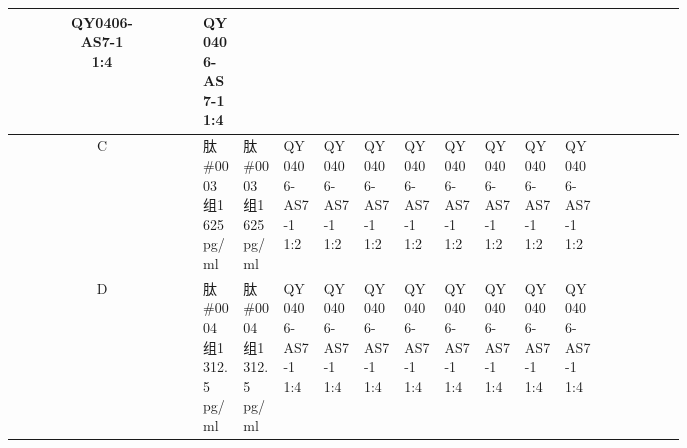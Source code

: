 \documentclass[UTF8,10pt,a4paper,fontset=fandol]{ctexart}
\begin{document}
\begin{center}
\begin{tabular}{c|*{12}{p{0.065\linewidth}|}}
\shortstack{QY0406-\\AS7-1\\1:4}&
\shortstack{QY0406-\\AS7-1\\1:4}& &\\ \hline
C&
\shortstack{肽\#0003\\组1\\625 pg/ml}&
\shortstack{肽\#0003\\组1\\625 pg/ml}&
\shortstack{QY0406-\\AS7-1\\1:2}&
\shortstack{QY0406-\\AS7-1\\1:2}&
\shortstack{QY0406-\\AS7-1\\1:2}&
\shortstack{QY0406-\\AS7-1\\1:2}&
\shortstack{QY0406-\\AS7-1\\1:2}&
\shortstack{QY0406-\\AS7-1\\1:2}&
\shortstack{QY0406-\\AS7-1\\1:2}&
\shortstack{QY0406-\\AS7-1\\1:2}& &\\ \hline
D&
\shortstack{肽\#0004\\组1\\312.5 pg/ml}&
\shortstack{肽\#0004\\组1\\312.5 pg/ml}&
\shortstack{QY0406-\\AS7-1\\1:4}&
\shortstack{QY0406-\\AS7-1\\1:4}&
\shortstack{QY0406-\\AS7-1\\1:4}&
\shortstack{QY0406-\\AS7-1\\1:4}&
\shortstack{QY0406-\\AS7-1\\1:4}&
\shortstack{QY0406-\\AS7-1\\1:4}&
\shortstack{QY0406-\\AS7-1\\1:4}&
\shortstack{QY0406-\\AS7-1\\1:4}& &\\ \hline

\end{tabular}
\end{center}
\end{document}

